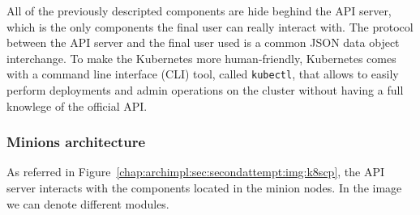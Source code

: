 All of the previously descripted components are hide beghind the API server,
which is the only components the final user can really interact with. The
protocol between the API server and the final user used is a common JSON data
object interchange. To make the Kubernetes more human-friendly, Kubernetes comes
with a command line interface (CLI) tool, called \verb!kubectl!, that allows to
easily perform deployments and admin operations on the cluster without having a
full knowlege of the official API.

\subsubsection{Minions architecture}

As referred in Figure~\ref{chap:archimpl:sec:secondattempt:img:k8scp}, the API
server interacts with the components located in the minion nodes. In the image
we can denote different modules.
